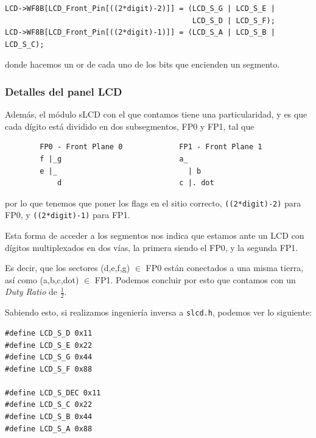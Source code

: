 \documentclass[a4paper,openright,12pt]{article}
\begin{document}
\begin{verbatim}
LCD->WF8B[LCD_Front_Pin[((2*digit)-2)]] = (LCD_S_G | LCD_S_E |
                                           LCD_S_D | LCD_S_F);
LCD->WF8B[LCD_Front_Pin[((2*digit)-1)]] = (LCD_S_A | LCD_S_B | LCD_S_C);
\end{verbatim}
donde hacemos un or de cada uno de los bits que encienden un segmento.

\subsubsection{Detalles del panel LCD}
Además, el módulo sLCD con el que contamos tiene una particularidad, y es que cada dígito está dividido en dos subsegmentos, FP0 y FP1, tal que

\begin{samepage}
\begin{verbatim}
        FP0 - Front Plane 0             FP1 - Front Plane 1
        f |_g                           a_
        e |_                              | b
            d                           c |. dot
\end{verbatim}
\end{samepage}
por lo que tenemos que poner los flags en el sitio correcto, \texttt{((2*digit)-2)} para FP0, y \texttt{((2*digit)-1)} para FP1.

Esta forma de acceder a los segmentos nos indica que estamos ante un LCD con dígitos multiplexados en dos vías, la primera siendo el FP0, y la segunda FP1. \autocite[430]{zhu2018embedded}

Es decir, que los sectores (d,e,f,g) $\in$ FP0 están conectados a una misma tierra, así como (a,b,c,dot) $\in$ FP1. Podemos concluir por esto que contamos con
un \emph{Duty Ratio} de $\frac{1}{2}$.

Sabiendo esto, si realizamos ingeniería inversa a \texttt{slcd.h}, podemos ver lo siguiente:
\begin{verbatim}
#define LCD_S_D 0x11
#define LCD_S_E 0x22
#define LCD_S_G 0x44
#define LCD_S_F 0x88

#define LCD_S_DEC 0x11
#define LCD_S_C 0x22
#define LCD_S_B 0x44
#define LCD_S_A 0x88
\end{verbatim}
\end{document}
